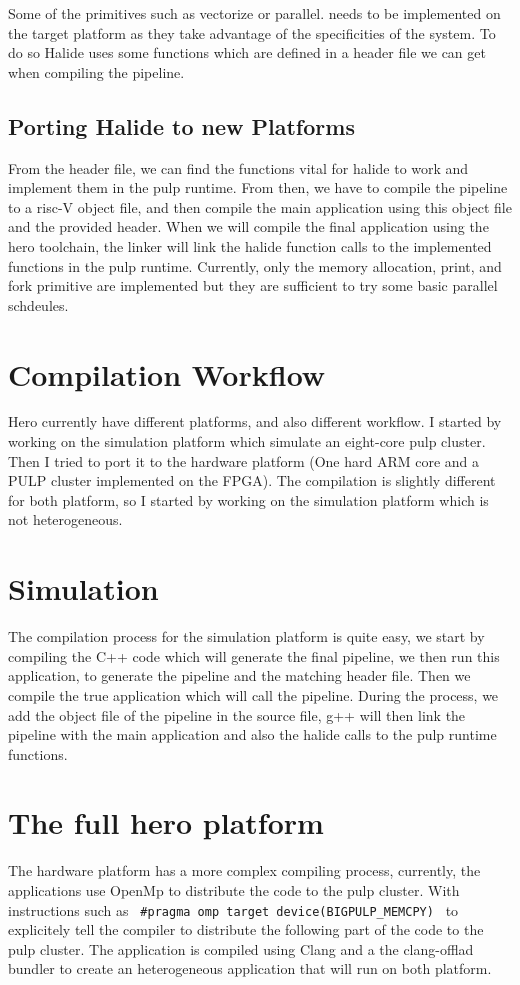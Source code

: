 	Some of the primitives such as vectorize or parallel. needs to be implemented on the target platform as they take advantage of the specificities of the system. To do so Halide uses some functions which are defined in a header file we can get when compiling the pipeline.

	\subsection { Porting Halide to new Platforms}
		From the header file, we can find the functions vital for halide to work and implement them in the pulp runtime. From then, we have to compile the pipeline to a risc-V object file, and then compile the main application using this object file and the provided header. When we will compile the final application using the hero toolchain, the linker will link the halide function calls to the implemented functions in the pulp runtime.
		Currently, only the memory allocation, print, and fork primitive are implemented but they are sufficient to try some basic parallel schdeules.

\section{Compilation Workflow}
	Hero currently have different platforms, and also different workflow. I started by working on the simulation platform which simulate an eight-core pulp cluster. Then I tried to port it to the hardware platform (One hard ARM core and a PULP cluster implemented on the FPGA). The compilation is slightly different for both platform, so I started by working on the simulation platform which is not heterogeneous.
\section{Simulation}
	The compilation process for the simulation platform is quite easy,  we start by compiling the C++ code which will generate the final pipeline, we then run this application, to generate the pipeline and the matching header file.
	Then we compile the true application which will call the pipeline. During the process, we add the object file of the pipeline in the source file, g++ will then link the pipeline with the main application and also the halide calls to the pulp runtime functions.
		
\section{The full hero platform}
	The hardware platform has a more complex compiling process, currently, the applications use OpenMp to distribute the code to the pulp cluster. With instructions such as \verb| #pragma omp target device(BIGPULP_MEMCPY) | to  explicitely tell the compiler to distribute the following part of the code to the pulp cluster. The application is compiled using Clang and a the clang-offlad bundler to create an heterogeneous application that will run on both platform.

